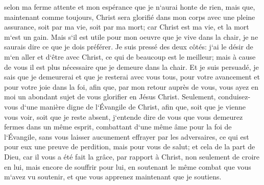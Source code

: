 \verse selon ma ferme attente et mon espérance que je n`aurai honte de rien, mais que, maintenant comme toujours, Christ sera glorifié dans mon corps avec une pleine assurance, soit par ma vie, soit par ma mort; 
\verse car Christ est ma vie, et la mort m`est un gain. 
\verse Mais s`il est utile pour mon oeuvre que je vive dans la chair, je ne saurais dire ce que je dois préférer. 
\verse Je suis pressé des deux côtés: j`ai le désir de m`en aller et d`être avec Christ, ce qui de beaucoup est le meilleur; 
\verse mais à cause de vous il est plus nécessaire que je demeure dans la chair. 
\verse Et je suis persuadé, je sais que je demeurerai et que je resterai avec vous tous, pour votre avancement et pour votre joie dans la foi, 
\verse afin que, par mon retour auprès de vous, vous ayez en moi un abondant sujet de vous glorifier en Jésus Christ. 
\verse Seulement, conduisez-vous d`une manière digne de l`Évangile de Christ, afin que, soit que je vienne vous voir, soit que je reste absent, j`entende dire de vous que vous demeurez fermes dans un même esprit, combattant d`une même âme pour la foi de l`Évangile, 
\verse sans vous laisser aucunement effrayer par les adversaires, ce qui est pour eux une preuve de perdition, mais pour vous de salut; 
\verse et cela de la part de Dieu, car il vous a été fait la grâce, par rapport à Christ, non seulement de croire en lui, mais encore de souffrir pour lui, 
\verse en soutenant le même combat que vous m`avez vu soutenir, et que vous apprenez maintenant que je soutiens. 

